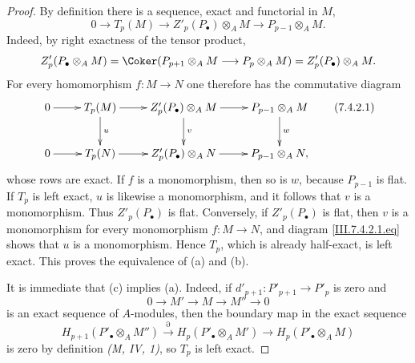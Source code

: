 \begin{proof}
By definition there is a sequence, exact and functorial in
$M$,
\[
  0
  \longrightarrow
  T_p(M)
  \longrightarrow
  Z'_p(P_\bullet)\otimes_A M
  \longrightarrow
  P_{p-1}\otimes_A M.
\]
Indeed, by right exactness of the tensor product,
\[
  Z'_p(P_\bullet\otimes_A M)
  =
  \Coker(P_{p+1}\otimes_A M\longrightarrow
         P_p\otimes_A M)
  =
  Z'_p(P_\bullet)\otimes_A M.
\]
For every homomorphism $f:M\to N$ one therefore has the
commutative diagram
\[
\xymatrix{
  0 \ar[r]
    & T_p(M) \ar[r] \ar[d]^{u}
    & Z'_p(P_\bullet)\otimes_A M \ar[r] \ar[d]^{v}
    & P_{p-1}\otimes_A M \ar[d]^{w} \\
  0 \ar[r]
    & T_p(N) \ar[r]
    & Z'_p(P_\bullet)\otimes_A N \ar[r]
    & P_{p-1}\otimes_A N,
}
\tag{7.4.2.1}\label{III.7.4.2.1.eq}
\]
whose rows are exact.  If $f$ is a monomorphism, then so is
$w$, because $P_{p-1}$ is flat.  If $T_p$ is left exact,
$u$ is likewise a monomorphism, and it follows that $v$ is a
monomorphism.  Thus $Z'_p(P_\bullet)$ is flat.  Conversely, if
$Z'_p(P_\bullet)$ is flat, then $v$ is a monomorphism for every
monomorphism $f:M\to N$, and diagram
\eqref{III.7.4.2.1.eq} shows that $u$ is a monomorphism.
Hence $T_p$, which is already half-exact, is left exact.  This
proves the equivalence of (a) and (b).

It is immediate that (c) implies (a).  Indeed, if
$d'_{p+1}:P'_{p+1}\to P'_p$ is zero and
\[
  0\longrightarrow M'\longrightarrow M\longrightarrow M''
  \longrightarrow 0
\]
is an exact sequence of $A$-modules, then the boundary map in
the exact sequence
\[
  H_{p+1}(P'_\bullet\otimes_A M'')
  \xrightarrow{\partial}
  H_p(P'_\bullet\otimes_A M')
  \longrightarrow
  H_p(P'_\bullet\otimes_A M)
\]
is zero by definition \emph{(M, IV, 1)}, so $T_p$ is left
exact.


\end{proof}
